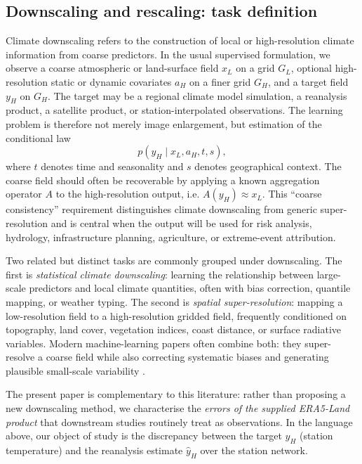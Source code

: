 \documentclass[a4paper,12pt,leqno]{article}
\begin{document}
\subsection{Downscaling and rescaling: task definition}

Climate downscaling refers to the construction of local or
high-resolution climate information from coarse predictors. In the usual
supervised formulation, we observe a coarse atmospheric or land-surface
field \(x_L\) on a grid \(G_L\), optional high-resolution static or
dynamic covariates \(a_H\) on a finer grid \(G_H\), and a target field
\(y_H\) on \(G_H\). The target may be a regional climate model
simulation, a reanalysis product, a satellite product, or
station-interpolated observations. The learning problem is therefore not
merely image enlargement, but estimation of the conditional law
\[
    p(y_H \mid x_L, a_H, t, s),
\]
where \(t\) denotes time and seasonality and \(s\) denotes geographical
context. The coarse field should often be recoverable by applying a known
aggregation operator \(A\) to the high-resolution output, i.e.
\(A(y_H) \approx x_L\). This ``coarse consistency'' requirement
distinguishes climate downscaling from generic super-resolution and is
central when the output will be used for risk analysis, hydrology,
infrastructure planning, agriculture, or extreme-event attribution.

Two related but distinct tasks are commonly grouped under downscaling.
The first is \emph{statistical climate downscaling}: learning the
relationship between large-scale predictors and local climate
quantities, often with bias correction, quantile mapping, or weather
typing. The second is \emph{spatial super-resolution}: mapping a
low-resolution field to a high-resolution gridded field, frequently
conditioned on topography, land cover, vegetation indices, coast
distance, or surface radiative variables. Modern machine-learning papers
often combine both: they super-resolve a coarse field while also
correcting systematic biases and generating plausible small-scale
variability
\parencite{maraun2018statistical_downscaling,labeurthre2024overview_downscaling}.

The present paper is complementary to this literature: rather than
proposing a new downscaling method, we characterise the \emph{errors of
the supplied ERA5-Land product} that downstream studies routinely treat as
observations. In the language above, our object of study is the
discrepancy between the target \(y_H\) (station temperature) and the
reanalysis estimate \(\hat y_H\) over the station network.
\end{document}
